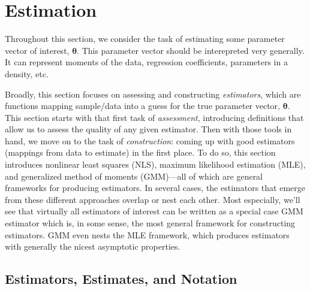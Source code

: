 \documentclass[12pt]{article}
\theoremstyle{plain}
\theoremstyle{definition}
\theoremstyle{remark}
\newcommand{\bstheta}{\boldsymbol{\theta}}
\begin{document}
\clearpage
\section{Estimation}

Throughout this section, we consider the task of estimating some
parameter vector of interest, $\bstheta$. This parameter vector should
be interepreted very generally. It can represent moments of the data,
regression coefficients, parameters in a density, etc.

Broadly, this section focuses on assessing and constructing
\emph{estimators}, which are functions mapping sample/data into a guess
for the true parameter vector, $\bstheta$.
This section starts with that first task of \emph{assessment},
introducing definitions that allow us to assess the quality of any given
estimator.
Then with those tools in hand, we move on to the task of
\emph{construction}: coming up with good estimators (mappings from
data to estimate) in the first place. To do so, this section introduces
nonlinear least squares (NLS), maximum likelihood estimation (MLE), and
generalized method of moments (GMM)---all of which are general
frameworks for producing estimators. In several cases, the estimators
that emerge from these different approaches overlap or nest each other.
Most especially, we'll see that virtually all estimators of interest can
be written as a special case GMM estimator which is, in some sense, the
most general framework for constructing estimators. GMM even nests the
MLE framework, which produces estimators with generally the nicest
asymptotic properties.


\subsection{Estimators, Estimates, and Notation}
\end{document}
